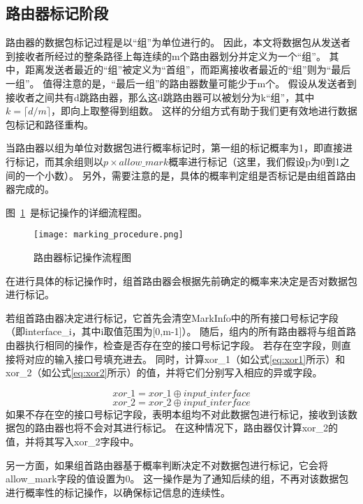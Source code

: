 \subsection{路由器标记阶段}
路由器的数据包标记过程是以“组”为单位进行的。
因此，本文将数据包从发送者到接收者所经过的整条路径上每连续的m个路由器划分并定义为一个“组”。
其中，距离发送者最近的“组”被定义为“首组”，而距离接收者最近的“组”则为“最后一组”。
值得注意的是，“最后一组”的路由器数量可能少于m个。
假设从发送者到接收者之间共有d跳路由器，那么这d跳路由器可以被划分为k“组”，其中$k=\lceil d/m \rceil$，即向上取整得到组数。
这样的分组方式有助于我们更有效地进行数据包标记和路径重构。\par
当路由器以组为单位对数据包进行概率标记时，第一组的标记概率为1，即直接进行标记，而其余组则以$p \times allow\_mark$概率进行标记（这里，我们假设p为0到1之间的一个小数）。
另外，需要注意的是，具体的概率判定组是否标记是由组首路由器完成的。\par
图~\ref{fig:marking_procedure}~是标记操作的详细流程图。
\begin{figure}[h]
	\centering
	\texttt{[image: marking\_procedure.png]}
	\caption{路由器标记操作流程图}
	\label{fig:marking_procedure}
\end{figure}
在进行具体的标记操作时，组首路由器会根据先前确定的概率来决定是否对数据包进行标记。\par
若组首路由器决定进行标记，它首先会清空MarkInfo中的所有接口号标记字段（即interface\_i，其中i取值范围为[0,m-1]）。
随后，组内的所有路由器将与组首路由器执行相同的操作，检查是否存在空的接口号标记字段。
若存在空字段，则直接将对应的输入接口号填充进去。
同时，计算xor\_1（如公式\ref{eq:xor1}所示）和xor\_2（如公式\ref{eq:xor2}所示）的值，并将它们分别写入相应的异或字段。\par
\begin{equation}
	\label{eq:xor1}
	xor\_1 = xor\_1 \oplus input\_interface
\end{equation}
\begin{equation}
	\label{eq:xor2}
	xor\_2 = xor\_2 \oplus input\_interface
\end{equation}
如果不存在空的接口号标记字段，表明本组均不对此数据包进行标记，接收到该数据包的路由器也将不会对其进行标记。
在这种情况下，路由器仅计算xor\_2的值，并将其写入xor\_2字段中。\par

另一方面，如果组首路由器基于概率判断决定不对数据包进行标记，它会将allow\_mark字段的值设置为0。
这一操作是为了通知后续的组，不再对该数据包进行概率性的标记操作，以确保标记信息的连续性。\par

